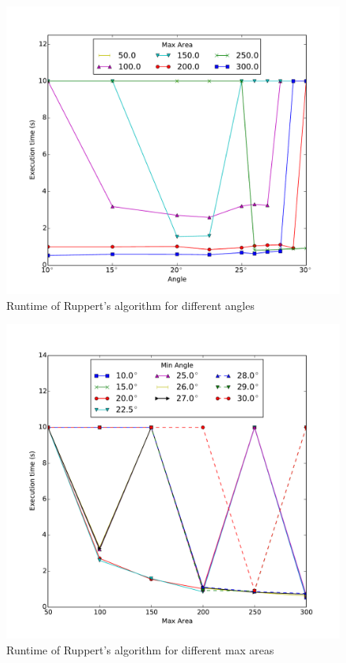 \begin{figure}[ht]
    \centering
    \includegraphics[width=\columnwidth]{../images/ruppert.pdf}
    \caption{Runtime of Ruppert's algorithm for different angles}
    \label{fig:ruppert-runtime}
\end{figure}

\begin{figure}[ht]
    \centering
    \includegraphics[width=\columnwidth]{../images/ruppert2.pdf}
    \caption{Runtime of Ruppert's algorithm for different max areas}
    \label{fig:ruppert-runtime2}
\end{figure}

